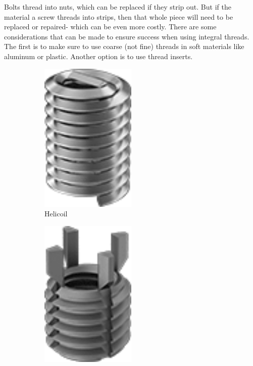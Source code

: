\documentclass[10pt,letterpaper]{book}
\begin{document}
	Bolts thread into nuts, which can be replaced if they strip out. But if the material a screw threads into strips, then that whole piece will need to be replaced or repaired- which can be even more costly. There are some considerations that can be made to ensure success when using integral threads. The first is to make sure to use coarse (not fine) threads in soft materials like aluminum or plastic. Another option is to use thread inserts.
	
	\begin{figure}[H]
		\centering
		\begin{subfigure}[b]{.24\linewidth}
			\includegraphics[width=0.5\textwidth]{imgs/helicoil.png}
			\caption{Helicoil}
		\end{subfigure}\begin{subfigure}[b]{.24\linewidth}
			\includegraphics[width=0.5\textwidth]{imgs/tanglock.png}

\end{subfigure}
\end{figure}
\end{document}

